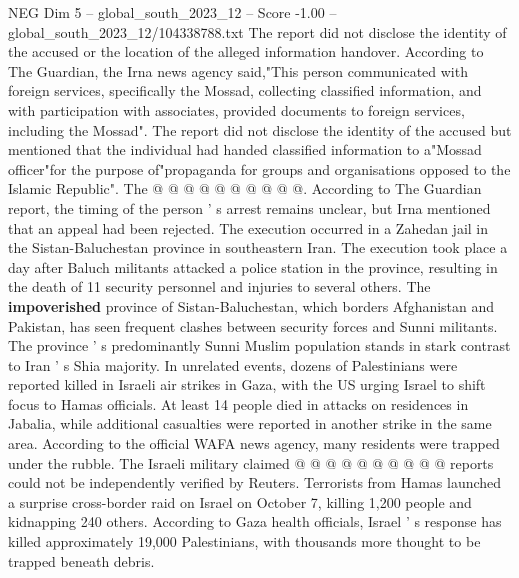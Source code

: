 \begin{textsample}{NEG Dim 5 – global\_south\_2023\_12 – Score -1.00 – global\_south\_2023\_12/104338788.txt}
The report did not disclose the identity of the accused or the location of the alleged information handover.
According to The Guardian, the Irna news agency said,"This person communicated with foreign services, specifically the Mossad, collecting classified information, and with participation with associates, provided documents to foreign services, including the Mossad".
The report did not disclose the identity of the accused but mentioned that the individual had handed classified information to a"Mossad officer"for the purpose of"propaganda for groups and organisations opposed to the Islamic Republic".
The @ @ @ @ @ @ @ @ @ @.
According to The Guardian report, the timing of the person ' s arrest remains unclear, but Irna mentioned that an appeal had been rejected.
The execution occurred in a Zahedan jail in the Sistan-Baluchestan province in southeastern Iran.
The execution took place a day after Baluch militants attacked a police station in the province, resulting in the death of 11 security personnel and injuries to several others.
The \textbf{impoverished} province of Sistan-Baluchestan, which borders Afghanistan and Pakistan, has seen frequent clashes between security forces and Sunni militants.
The province ' s predominantly Sunni Muslim population stands in stark contrast to Iran ' s Shia majority.
In unrelated events, dozens of Palestinians were reported killed in Israeli air strikes in Gaza, with the US urging Israel to shift focus to Hamas officials.
At least 14 people died in attacks on residences in Jabalia, while additional casualties were reported in another strike in the same area.
According to the official WAFA news agency, many residents were trapped under the rubble.
The Israeli military claimed @ @ @ @ @ @ @ @ @ @ reports could not be independently verified by Reuters.
Terrorists from Hamas launched a surprise cross-border raid on Israel on October 7, killing 1,200 people and kidnapping 240 others.
According to Gaza health officials, Israel ' s response has killed approximately 19,000 Palestinians, with thousands more thought to be trapped beneath debris.

\end{textsample}
